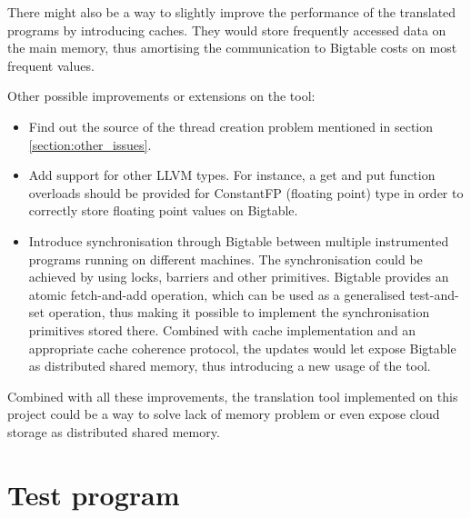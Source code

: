 \documentclass[bsc,frontabs,twoside,singlespacing,parskip,deptreport]{infthesis}     %
\begin{document}
There might also be a way to slightly improve the performance of the translated programs by introducing caches. They would store frequently accessed data on the main memory, thus amortising the communication to Bigtable costs on most frequent values.

Other possible improvements or extensions on the tool:
\begin{itemize}
\item
Find out the source of the thread creation problem mentioned in section \ref{section:other_issues}.
\item
Add support for other LLVM types. For instance, a get and put function overloads should be provided for ConstantFP (floating point) type in order to correctly store floating point values on Bigtable.
\item
Introduce synchronisation through Bigtable between multiple instrumented programs running on different machines. The synchronisation could be achieved by using locks, barriers and other primitives. Bigtable provides an atomic fetch-and-add operation, which can be used as a generalised test-and-set operation, thus making it possible to implement the synchronisation primitives stored there. Combined with cache implementation and an appropriate cache coherence protocol, the updates would let expose Bigtable as distributed shared memory, thus introducing a new usage of the tool.
\end{itemize}

Combined with all these improvements, the translation tool implemented on this project could be a way to solve lack of memory problem or even expose cloud storage as distributed shared memory.




\appendix
\chapter{Test program}
\label{section:test}
\end{document}
